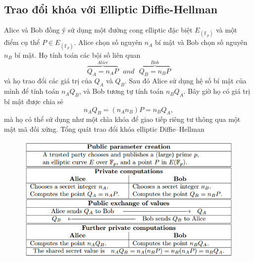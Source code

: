 \documentclass[a4paper,12pt]{report}
\begin{document}
\subsection*{Trao đổi khóa với Elliptic Diffie-Hellman}
Alice và Bob đồng ý sử dụng một đường cong elliptic đặc biệt $E_(\mathbb{F}_p)$ và một điểm cụ thể $P \in E_(\mathbb{F}_p)$. Alice chọn số nguyên $n_A$ bí mật và Bob chọn số nguyên $n_B$ bí mật. Họ tính toán các bội số liên quan
\begin{displaymath}
\overbrace{Q_A = n_AP}^{Alice} \ \ \ and \ \ \ \overbrace{Q_B = n_BP}^{Bob}
\end{displaymath}
và họ trao đổi các giá trị của $Q_A$ và $Q_B$. Sau đó Alice sử dụng hệ số bí mật của mình để tính toán $n_AQ_B$, và Bob tương tự tính toán $n_BQ_A$. Bây giờ họ có giá trị bí mật được chia sẻ
\begin{displaymath}
n_AQ_B = (n_An_B)P = n_BQ_A,
\end{displaymath}
mà họ có thể sử dụng như một chìa khóa để giao tiếp riêng tư thông qua một mật mã đối xứng. Tổng quát trao đổi khóa elliptic Diffie–Hellman
\begin{figure}[h]
\begin{center}
\includegraphics[scale=0.9]{../im7.png}
\caption{}
\end{center}
\end{figure}
\end{document}
